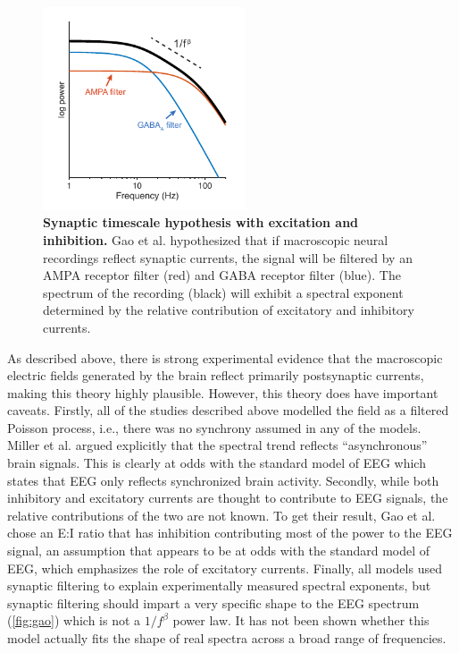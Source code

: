 \begin{figure}
\vspace{-20pt}
\centering
\includegraphics[width=60mm]{Figures/chapter1/EI.pdf}
\vspace{-14pt}
\caption[Synaptic timescale hypothesis with excitation and inhibition]{\textbf{Synaptic timescale hypothesis with excitation and inhibition.} Gao et al. \cite{Gao2017} hypothesized that if macroscopic neural recordings reflect synaptic currents, the signal will be filtered by an AMPA receptor filter (red) and GABA receptor filter (blue). The spectrum of the recording (black) will exhibit a spectral exponent determined by the relative contribution of excitatory and inhibitory currents.}  \label{fig:gao}
\end{figure}

As described above, there is strong experimental evidence that the macroscopic electric fields generated by the brain reflect primarily postsynaptic currents, making this theory highly plausible. However, this theory does have important caveats. Firstly, all of the studies described above modelled the field as a filtered Poisson process, i.e., there was no synchrony assumed in any of the models. Miller et al.\cite{Miller2009} argued explicitly that the spectral trend reflects ``asynchronous'' brain signals. This is clearly at odds with the standard model of EEG which states that EEG only reflects synchronized brain activity. Secondly, while both inhibitory and excitatory currents are thought to contribute to EEG signals, the relative contributions of the two are not known. To get their result, Gao et al. \cite{Gao2017} chose an E:I ratio that has inhibition contributing  most of the power to the EEG signal, an assumption that appears to be at odds with the standard model of EEG, which emphasizes the role of excitatory currents. Finally, all models used synaptic filtering to explain experimentally measured spectral exponents, but synaptic filtering should impart a very specific shape to the EEG spectrum (\autoref{fig:gao}) which is not a $1/f^\beta$ power law. It has not been shown whether this model actually fits the shape of real spectra across a broad range of frequencies.

